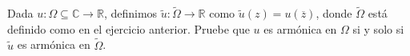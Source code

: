 \documentclass[../main.tex]{subfiles}
\begin{document}
\begin{problema}
    Dada \(u \colon \Omega \subseteq \mathbb{C} \to \mathbb{R}\), definimos
    \(\tilde{u} \colon \tilde{\Omega} \to \mathbb{R}\) como \(\tilde{u}(z) =
    u(\overline{z})\), donde \(\tilde{\Omega}\) está definido como en el ejercicio
    anterior. Pruebe que \(u\) es armónica en \(\Omega\) si y solo si \(\tilde{u}\) es
    armónica en \(\tilde{\Omega}\).
\end{problema}
\end{document}
